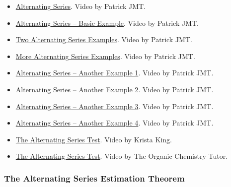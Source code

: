 \begin{itemize}

\item \href{https://www.youtube.com/watch?v=-K9Qt6YUIrI}{Alternating Series}. 
Video by Patrick JMT.

\item \href{https://www.youtube.com/watch?v=oJEhVFTos5o}{Alternating Series – Basic Example}. 
Video by Patrick JMT.

\item \href{https://www.youtube.com/watch?v=e4_dE0YiKlA}{Two Alternating Series Examples}. 
Video by Patrick JMT.

\item \href{https://www.youtube.com/watch?v=zgTRNpKcenE}{More Alternating Series Examples}. 
Video by Patrick JMT.

\item \href{https://www.youtube.com/watch?v=xL30cRRXWsI}{Alternating Series – Another Example 1}. 
Video by Patrick JMT.

\item \href{https://www.youtube.com/watch?v=SFs2ys2gpoE}{Alternating Series – Another Example 2}. 
Video by Patrick JMT.

\item \href{https://www.youtube.com/watch?v=XDC53pvATcs}{Alternating Series – Another Example 3}. 
Video by Patrick JMT.

\item \href{https://www.youtube.com/watch?v=aOiZvfFAMW8}{Alternating Series – Another Example 4}. 
Video by Patrick JMT.

\item \href{https://www.youtube.com/watch?v=iYNgFPFKWy0}{The Alternating Series Test}. 
Video by Krista King.

\item \href{https://www.youtube.com/watch?v=DRO1kPT4iS8}{The Alternating Series Test}. 
Video by The Organic Chemistry Tutor.

\end{itemize}

\subsubsection{The Alternating Series Estimation Theorem}
\label{sss:thea-9bbb}


